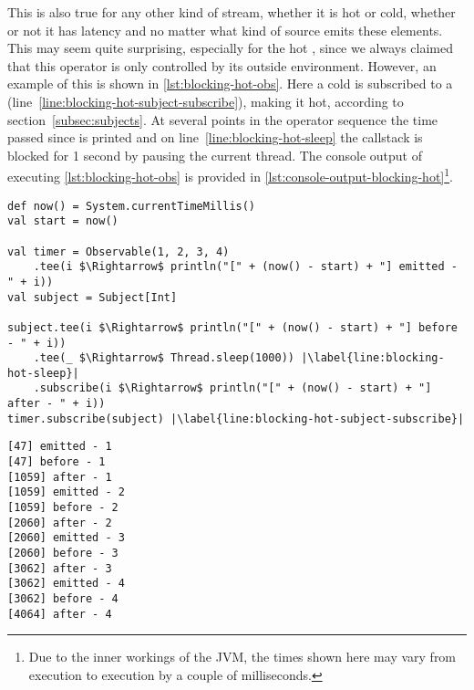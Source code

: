 This is also true for any other kind of stream, whether it is hot or cold, whether or not it has latency and no matter what kind of source emits these elements. This may seem quite surprising, especially for the hot \obs, since we always claimed that this operator is only controlled by its outside environment. However, an example of this is shown in \autoref{lst:blocking-hot-obs}. Here a cold \obs is subscribed to a \subj (line~\ref{line:blocking-hot-subject-subscribe}), making it hot, according to section~\ref{subsec:subjects}. At several points in the operator sequence the time passed since  is printed and on line~\ref{line:blocking-hot-sleep} the callstack is blocked for 1 second by pausing the current thread. The console output of executing \autoref{lst:blocking-hot-obs} is provided in \autoref{lst:console-output-blocking-hot}\footnote{Due to the inner workings of the JVM, the times shown here may vary from execution to execution by a couple of milliseconds.}.

\begin{minipage}{\linewidth}
\begin{lstlisting}[style=ScalaStyle, caption={Applying callstack blocking on a hot \obs}, label={lst:blocking-hot-obs}]
def now() = System.currentTimeMillis()
val start = now()

val timer = Observable(1, 2, 3, 4)
    .tee(i $\Rightarrow$ println("[" + (now() - start) + "] emitted - " + i))
val subject = Subject[Int]

subject.tee(i $\Rightarrow$ println("[" + (now() - start) + "] before - " + i))
    .tee(_ $\Rightarrow$ Thread.sleep(1000)) |\label{line:blocking-hot-sleep}|
    .subscribe(i $\Rightarrow$ println("[" + (now() - start) + "] after - " + i))
timer.subscribe(subject) |\label{line:blocking-hot-subject-subscribe}|
\end{lstlisting}
\end{minipage}

\begin{minipage}{\linewidth}
\begin{lstlisting}[style=ScalaStyle, caption={Console output from \autoref{lst:blocking-hot-obs}}, label={lst:console-output-blocking-hot}]
[47] emitted - 1
[47] before - 1
[1059] after - 1
[1059] emitted - 2
[1059] before - 2
[2060] after - 2
[2060] emitted - 3
[2060] before - 3
[3062] after - 3
[3062] emitted - 4
[3062] before - 4
[4064] after - 4
\end{lstlisting}
\end{minipage}

